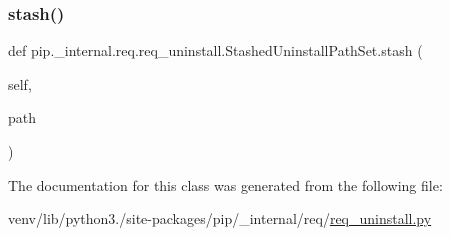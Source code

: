 \subsubsection{\texorpdfstring{stash()}{stash()}}
{\footnotesize\ttfamily def pip.\+\_\+internal.\+req.\+req\+\_\+uninstall.\+Stashed\+Uninstall\+Path\+Set.\+stash (\begin{DoxyParamCaption}\item[{}]{self,  }\item[{}]{path }\end{DoxyParamCaption})}



The documentation for this class was generated from the following file\+:\begin{DoxyCompactItemize}
\item 
venv/lib/python3./site-\/packages/pip/\+\_\+internal/req/\hyperlink{req__uninstall_8py}{req\+\_\+uninstall.\+py}\end{DoxyCompactItemize}
